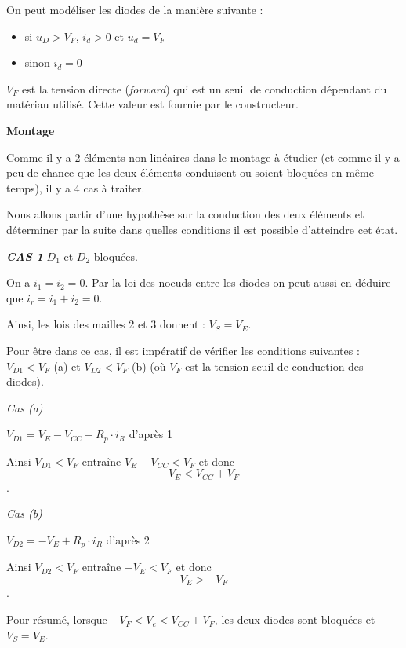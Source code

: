 \documentclass[a4paper,french]{paper}
\begin{document}
On peut modéliser les diodes de la manière suivante :
\begin{itemize}
	\item si $u_D > V_F$, $i_d > 0$ et $u_d = V_F$
	\item sinon $i_d = 0$
\end{itemize}

$V_F$ est la tension directe (\textit{forward}) qui est un seuil de conduction dépendant du matériau utilisé. Cette valeur est fournie par le constructeur.

\bigskip

\textbf{Montage}

Comme il y a 2 éléments non linéaires dans le montage à étudier (et comme il y a peu de chance que les deux éléments conduisent ou soient bloquées en même temps), il y a 4 cas à traiter.

Nous allons partir d'une hypothèse sur la conduction des deux éléments et déterminer par la suite dans quelles conditions il est possible d'atteindre cet état.

\bigskip

\textbf{\textit{CAS 1}} $D_1$ et $D_2$ bloquées.

On a $i_1 = i_2 = 0$. Par la loi des noeuds entre les diodes on peut aussi en déduire que $i_r = i_1 + i_2 = 0$.

Ainsi, les lois des mailles 2 et 3 donnent : $V_S = V_E$.

\medskip

Pour être dans ce cas, il est impératif de vérifier les conditions suivantes : $V_{D1} < V_F$ (a) et $V_{D2} < V_F$ (b) (où $V_F$ est la tension seuil de conduction des diodes).

\medskip

\textit{Cas (a)}

$V_{D1} = V_E - V_{CC} - R_p \cdot i_R$ d'après 1

Ainsi $V_{D1} < V_F$ entraîne $V_E - V_{CC} < V_F$ et donc $$\boxed{V_E < V_{CC} + V_F}$$.

\medskip

\textit{Cas (b)}

$V_{D2} = - V_E + R_p \cdot i_R$ d'après 2

Ainsi $V_{D2} < V_F$ entraîne $- V_E < V_F$ et donc $$\boxed{V_E > - V_F}$$.

\medskip

Pour résumé, lorsque $ - V_F < V_e < V_{CC} + V_F $, les deux diodes sont bloquées et $V_S = V_E$.

\bigskip
\end{document}
